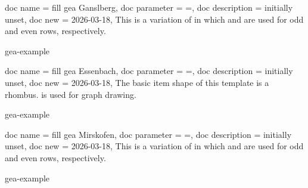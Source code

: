 \documentclass[a4paper,11pt]{article}
\begin{document}
\begin{docTikzKeys}
  {
    {
      doc name        = fill gea Ganslberg,
      doc parameter   = {=},
      doc description = {initially unset},
      doc new         = 2026-03-18,
    }
  }
  This is a variation of  in which
   and  are used for
  odd and even rows, respectively.

\begin{dispExample*}{gea-example}
\end{dispExample*}
\end{docTikzKeys}

\clearpage

\begin{docTikzKeys}
  {
    {
      doc name        = fill gea Essenbach,
      doc parameter   = {=},
      doc description = {initially unset},
      doc new         = 2026-03-18,
    }
  }
  The basic item shape of this template is a rhombus.
   is used for graph drawing.

\begin{dispExample*}{gea-example}
\end{dispExample*}
\end{docTikzKeys}


\begin{docTikzKeys}
  {
    {
      doc name        = fill gea Mirskofen,
      doc parameter   = {=},
      doc description = {initially unset},
      doc new         = 2026-03-18,
    }
  }
  This is a variation of  in which
   and  are used for
  odd and even rows, respectively.

\begin{dispExample*}{gea-example}
\end{dispExample*}
\end{docTikzKeys}
\end{document}
